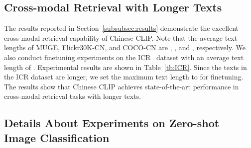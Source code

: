 \documentclass[11pt]{article}
\begin{document}
\subsection{Cross-modal Retrieval with Longer Texts}
The results reported in Section~\ref{subsubsec:results} demonstrate the excellent cross-modal retrieval capability of Chinese CLIP.
Note that the average text lengths of MUGE, Flickr30K-CN, and COCO-CN are , , and , respectively.
We also conduct finetuning experiments on the ICR~\citep{r2d2} dataset with an average text length of . 
Experimental results are shown in Table~\ref{tb:ICR}.
Since the texts in the ICR dataset are longer, we set the maximum text length to  for finetuning.
The results show that Chinese CLIP achieves state-of-the-art performance in cross-modal retrieval tasks with longer texts.




\subsection{Details About Experiments on Zero-shot Image Classification}
\end{document}
